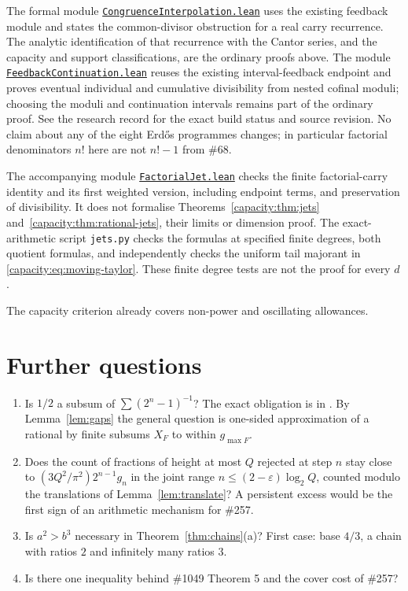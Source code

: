 \documentclass[11pt]{article}
\begin{document}
The formal module
\href{\repobase/lean/ErdosProblems/Synthesis/CongruenceInterpolation.lean}{\texttt{CongruenceInterpolation.lean}}
uses the existing feedback module and states the common-divisor obstruction
for a real carry recurrence. The analytic identification of that recurrence
with the Cantor series, and the capacity and support classifications, are
the ordinary proofs above. The module
\href{\repobase/lean/ErdosProblems/Synthesis/FeedbackContinuation.lean}{\texttt{FeedbackContinuation.lean}}
reuses the existing interval-feedback endpoint and proves eventual individual
and cumulative divisibility from nested cofinal moduli; choosing the moduli
and continuation intervals remains part of the ordinary proof. See the research record for the exact build status and source
revision. No claim about any of the eight Erd\H{o}s programmes changes;
in particular factorial denominators $n!$ here are not $n!-1$ from \#68.


The accompanying module
\href{https://github.com/wcook04/plectis-erdos/blob/2bd14835b940b3c695a9cc8828c7e2967d65c053/lean/ErdosProblems/Synthesis/FactorialJet.lean}{\texttt{FactorialJet.lean}}
checks the finite
factorial-carry identity and its first weighted version, including endpoint
terms, and preservation of divisibility. It does not formalise
Theorems~\ref{capacity:thm:jets} and~\ref{capacity:thm:rational-jets}, their
limits or dimension proof. The
exact-arithmetic script \texttt{jets.py} checks the formulas at specified
finite degrees, both quotient formulas, and independently checks the uniform tail majorant in
\eqref{capacity:eq:moving-taylor}. These finite degree tests are not the
proof for every $d$.

The capacity criterion already covers non-power and oscillating allowances.
\section{Further questions}\label{sec:questions}


\begin{enumerate}
\item Is $1/2$ a subsum of $\sum(2^n-1)^{-1}$?  The exact obligation is in
  \cite[Theorem~7]{plectis257}.  By Lemma~\ref{lem:gaps} the general question is
  one-sided approximation of a rational by finite subsums $X_F$ to within
  $g_{\max F}$.
\item Does the count of fractions of height at most $Q$ rejected at step $n$
  stay close to $(3Q^2/\pi^2)2^{n-1}g_n$ in the joint range
  $n\le(2-\varepsilon)\log_2Q$, counted modulo the translations of
  Lemma~\ref{lem:translate}?  A persistent excess would be the first sign of an
  arithmetic mechanism for \#257.
\item Is $a^2>b^3$ necessary in Theorem~\ref{thm:chains}(a)?  First case: base $4/3$, a chain
  with ratios $2$ and infinitely many ratios $3$.
\item Is there one inequality behind \#1049 Theorem 5 and the cover cost of
  \#257?
\end{enumerate}
\end{document}
